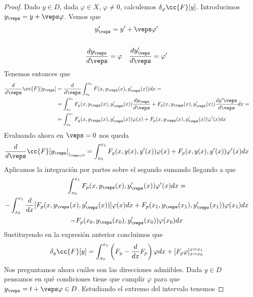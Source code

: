 \begin{teo}
    \begin{proof}
        Dado $y\in D$, dada $\varphi\in X$, $\varphi\neq 0$, calculemos $\delta_\varphi \cc{F}[y]$. Introducimos $y_\veps = y + \veps \varphi$. Vemos que 
        \begin{gather*}
            y'_\veps = y' + \veps \varphi'\\\\
            \frac{dy_\veps}{d\veps} = \varphi \ \ \ \frac{dy'_\veps}{d\veps} = \varphi'
        \end{gather*}
        Tenemos entonces que 
        \begin{align*}
            \frac{d}{d\veps}\cc{F}[y_\veps] &= \frac{d}{d\veps} \int_{x_0}^{x_1} F(x, y_\veps(x), y_\veps'(x)) dx =\\
            &= \int_{x_0}^{x_1} F_y(x, y_\veps(x), y_\veps'(x))\frac{dy_\veps}{d\veps} + F_p(x, y_\veps(x), y_\veps'(x))\frac{dy'\veps}{d\veps} dx =\\
            &= \int_{x_0}^{x_1} F_y(x, y_\veps(x), y_\veps'(x)) \varphi(x) + F_p(x, y_\veps(x), y_\veps'(x))\varphi'(x) dx
        \end{align*}
        Evaluando ahora en $\veps=0$ nos queda
        \begin{align*}
            \frac{d}{d\veps} \cc{F}[y_\veps]_{|_{\veps = 0}} = \int_{x_0}^{x_1} F_y(x, y(x), y'(x)) \varphi(x) + F_p(x, y(x), y'(x))\varphi'(x) dx
        \end{align*}
        Aplicamos la integración por partes sobre el segundo sumando llegando a que 
        \begin{gather*}
            \int_{x_0}^{x_1} F_p(x, y_\veps(x), y_\veps'(x))\varphi'(x) dx =\\ - \int_{x_0}^{x_1} \frac{d}{dx}[F_p(x, y_\veps(x), y_\veps'(x))] \varphi(x) dx + F_p(x_1, y_\veps(x_1), y_\veps'(x_1))\varphi(x_1) dx \\
            - F_p(x_0, y_\veps(x_0), y_\veps'(x_0))\varphi(x_0) dx
        \end{gather*}
        Sustituyendo en la expresión anterior concluimos que
        \begin{gather*}
            \delta_y \cc{F}[y] = \int_{x_0}^{x_1} \left(F_y - \frac{d}{dx} F_p\right)\varphi dx + [F_p \varphi]_{x=x_0}^{x= x_1}
        \end{gather*}
        Nos preguntamos ahora cuáles son las direcciones admiibles. Dada $y\in D$ pensamos en qué condiciones tiene que cumplir $\varphi$ para que $y_\veps = t+\veps\varphi \in D$. Estudiando el extremo del intervalo tenemos

\end{proof}
\end{teo}
